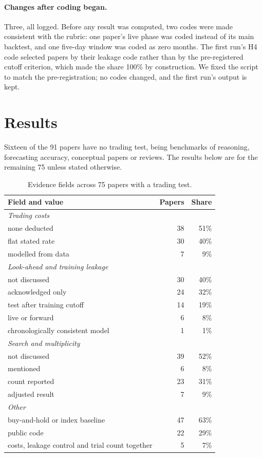 \documentclass[11pt]{article}
\begin{document}
\paragraph{Changes after coding began.} Three, all logged. Before any result
was computed, two codes were made consistent with the rubric: one paper's live
phase was coded instead of its main backtest, and one five-day window was coded
as zero months. The first run's H4 code selected papers by their leakage code
rather than by the pre-registered cutoff criterion, which made the share 100\%
by construction. We fixed the script to match the pre-registration; no codes
changed, and the first run's output is kept.

\section{Results}\label{sec:results}

Sixteen of the 91 papers have no trading test, being benchmarks of reasoning,
forecasting accuracy, conceptual papers or reviews. The results below are for the
remaining 75 unless stated otherwise.

\begin{table}[t]
\centering
\caption{Evidence fields across 75 papers with a trading test.}\label{tab:fields}
\begin{tabular}{lrr}
\toprule
Field and value & Papers & Share \\
\midrule
\multicolumn{3}{l}{\emph{Trading costs}} \\
\quad none deducted & 38 & 51\% \\
\quad flat stated rate & 30 & 40\% \\
\quad modelled from data & 7 & 9\% \\
\multicolumn{3}{l}{\emph{Look-ahead and training leakage}} \\
\quad not discussed & 30 & 40\% \\
\quad acknowledged only & 24 & 32\% \\
\quad test after training cutoff & 14 & 19\% \\
\quad live or forward & 6 & 8\% \\
\quad chronologically consistent model & 1 & 1\% \\
\multicolumn{3}{l}{\emph{Search and multiplicity}} \\
\quad not discussed & 39 & 52\% \\
\quad mentioned & 6 & 8\% \\
\quad count reported & 23 & 31\% \\
\quad adjusted result & 7 & 9\% \\
\multicolumn{3}{l}{\emph{Other}} \\
\quad buy-and-hold or index baseline & 47 & 63\% \\
\quad public code & 22 & 29\% \\
\quad costs, leakage control and trial count together & 5 & 7\% \\
\bottomrule
\end{tabular}
\end{table}
\end{document}
